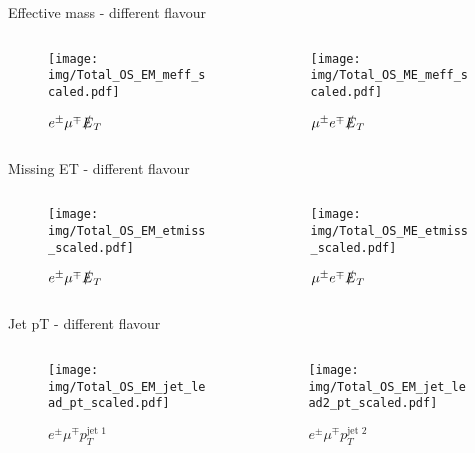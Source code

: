 \documentclass{beamer}
\begin{document}
\begin{frame}{Effective mass - different flavour}
  \begin{columns}
    \begin{column}{0.45\textwidth}\begin{figure}
      \caption{$e^{\pm}\mu^{\mp}\slashed{E}_{T}$}
      \texttt{[image: img/Total\_OS\_EM\_meff\_scaled.pdf]}
    \end{figure}\end{column}
    \begin{column}{0.45\textwidth}\begin{figure}
      \caption{$\mu^{\pm}e^{\mp}\slashed{E}_{T}$}
      \texttt{[image: img/Total\_OS\_ME\_meff\_scaled.pdf]}
    \end{figure}\end{column}
  \end{columns}
\end{frame}

\begin{frame}{Missing ET - different flavour}
  \begin{columns}
    \begin{column}{0.45\textwidth}\begin{figure}
      \caption{$e^{\pm}\mu^{\mp}\slashed{E}_{T}$}
      \texttt{[image: img/Total\_OS\_EM\_etmiss\_scaled.pdf]}
    \end{figure}\end{column}
    \begin{column}{0.45\textwidth}\begin{figure}
      \caption{$\mu^{\pm}e^{\mp}\slashed{E}_{T}$}
      \texttt{[image: img/Total\_OS\_ME\_etmiss\_scaled.pdf]}
    \end{figure}\end{column}
  \end{columns}
\end{frame}

\begin{frame}{Jet pT - different flavour}
  \begin{columns}
    \begin{column}{0.45\textwidth}\begin{figure}
      \caption{$e^{\pm}\mu^{\mp}p_{T}^{\text{jet 1}}$}
      \texttt{[image: img/Total\_OS\_EM\_jet\_lead\_pt\_scaled.pdf]}
    \end{figure}\end{column}
    \begin{column}{0.45\textwidth}\begin{figure}
      \caption{$e^{\pm}\mu^{\mp}p_{T}^{\text{jet 2}}$}
      \texttt{[image: img/Total\_OS\_EM\_jet\_lead2\_pt\_scaled.pdf]}
    \end{figure}\end{column}
  \end{columns}
\end{frame}
\end{document}
